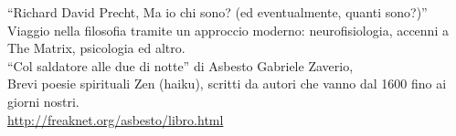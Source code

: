   ``Richard David Precht, Ma io chi sono? (ed eventualmente, quanti sono?)''\\
  Viaggio nella filosofia tramite un approccio moderno: neurofisiologia, accenni a The Matrix, psicologia ed altro.\\
   
  ``Col saldatore alle due di notte'' di Asbesto Gabriele Zaverio,\\
  Brevi poesie spirituali Zen (haiku), scritti da autori che vanno dal 1600 fino ai giorni nostri.\\
  \url{http://freaknet.org/asbesto/libro.html}

